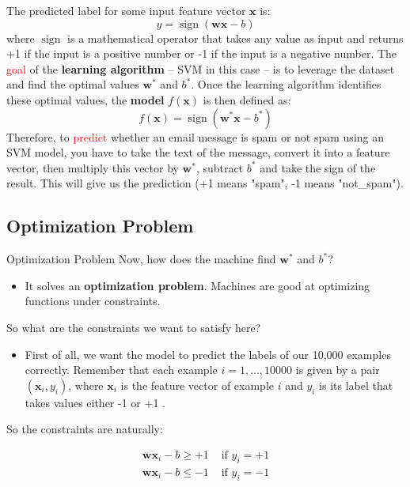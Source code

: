 \documentclass[10pt,dvipsnames]{beamer}
\begin{document}
\begin{frame}
    The predicted label for some input feature vector \(\mathbf{x}\) is:
    \begin{equation}
        y=\operatorname{sign}(\mathbf{w} \mathbf{x}-b)
    \end{equation}
    where \(\operatorname{sign}\) is a mathematical operator that takes any value as input and returns +1 if the input is a positive number or -1 if the input is a negative number.
    The \textcolor{red}{goal} of the \textbf{learning algorithm} -- SVM in this case -- is to leverage the dataset and find the optimal values \(\mathbf{w}^{*}\) and \(b^{*}\). Once the learning algorithm identifies these optimal values, the \textbf{model} \(f(\mathbf{x})\) is then defined as:
    \begin{equation}
        f(\mathbf{x})=\operatorname{sign}\left(\mathbf{w}^{*} \mathbf{x}-b^{*}\right)
    \end{equation}
    Therefore, to \textcolor{red}{predict} whether an email message is spam or not spam using an SVM model,
    you have to take the text of the message, convert it into a feature vector, then multiply this
    vector by \(\mathbf{w}^{*}\), subtract \(b^{*}\) and take the sign of the result. This will give us the prediction (+1 means "spam", -1 means "not\_spam").
\end{frame}

\subsection{Optimization Problem}
\begin{frame}{Optimization Problem}
    Now, how does the machine find $\mathbf{w}^{*}$ and $b^{*}$?
    \begin{itemize}
        \item It solves an \textbf{optimization problem}. Machines are good at optimizing functions under constraints.
    \end{itemize}


    So what are the constraints we want to satisfy here?
    \begin{itemize}
        \item   First of all, we want the model to predict the labels of our 10,000 examples correctly. Remember that each example $i=1, \ldots, 10000$ is given by a pair $\left(\mathbf{x}_{i}, y_{i}\right)$, where $\mathbf{x}_{i}$ is the feature vector of example $i$ and $y_{i}$ is its label that takes values either -1 or +1 .
    \end{itemize}
    So the constraints are naturally:

    $$
        \begin{array}{ll}
            \mathbf{w} \mathbf{x}_{i}-b \geq+1 & \text { if } y_{i}=+1 \\
            \mathbf{w} \mathbf{x}_{i}-b \leq-1 & \text { if } y_{i}=-1
        \end{array}
    $$
\end{frame}
\end{document}
